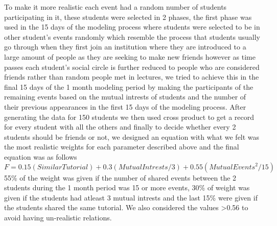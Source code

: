 \documentclass[10pt]{article}
\begin{document}
To make it more realistic each event had a random number of students participating in it, these students were selected in 2 phases, the first phase was used in the 15 days of the modeling process
where students were selected to be in other student's events randomly which resemble the process that students usually go through when they first join an institution where they are introduced to a large amount of
people as they are seeking to make new friends however as time passes each student's social circle is further reduced to people who are considered friends rather than random people met in lectures, we tried to achieve this
in the final 15 days of the 1 month modeling period by making the participants of the remaining events based on the mutual intrests of students and the number of their previous appearances in the first 15 days of the modeling process.
After generating the data for 150 students we then used cross product to get a record for every student with all the others and finally to decide whether every 2 students should be friends or not, we designed an equation with what we felt
was the most realistic weights for each parameter described above and the final equation was as follows
\begin{equation}
F=0.15(SimilarTutorial)+0.3(MutualIntrests/3)+0.55(MutualEvents^2/15)
\end{equation}
55\% of the weight was given if the number of shared events between the 2 students during the 1 month period was 15 or more events, 30\% of weight was given if the students had atleast 3 mutual intrests
and the last 15\% were given if the students shared the same tutorial. We also considered the values  >0.56 to avoid having un-realistic relations.


   
\end{document}
